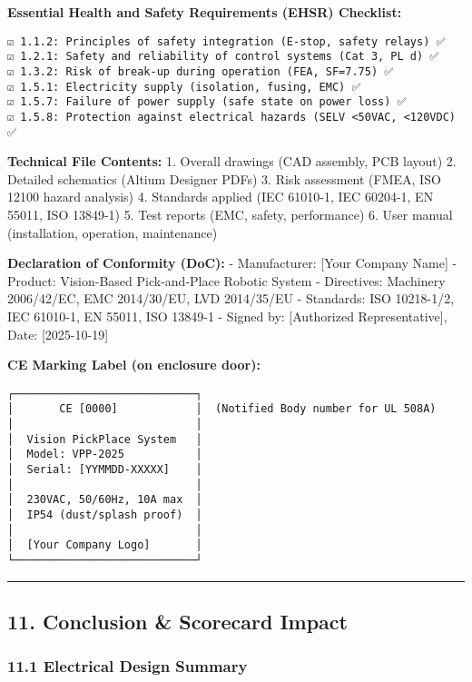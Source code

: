 \documentclass[
]{article}
\begin{document}
\textbf{Essential Health and Safety Requirements (EHSR) Checklist:}

\begin{verbatim}
☑ 1.1.2: Principles of safety integration (E-stop, safety relays) ✅
☑ 1.2.1: Safety and reliability of control systems (Cat 3, PL d) ✅
☑ 1.3.2: Risk of break-up during operation (FEA, SF=7.75) ✅
☑ 1.5.1: Electricity supply (isolation, fusing, EMC) ✅
☑ 1.5.7: Failure of power supply (safe state on power loss) ✅
☑ 1.5.8: Protection against electrical hazards (SELV <50VAC, <120VDC) ✅
\end{verbatim}

\textbf{Technical File Contents:} 1. Overall drawings (CAD assembly, PCB
layout) 2. Detailed schematics (Altium Designer PDFs) 3. Risk assessment
(FMEA, ISO 12100 hazard analysis) 4. Standards applied (IEC 61010-1, IEC
60204-1, EN 55011, ISO 13849-1) 5. Test reports (EMC, safety,
performance) 6. User manual (installation, operation, maintenance)

\textbf{Declaration of Conformity (DoC):} - Manufacturer: {[}Your
Company Name{]} - Product: Vision-Based Pick-and-Place Robotic System -
Directives: Machinery 2006/42/EC, EMC 2014/30/EU, LVD 2014/35/EU -
Standards: ISO 10218-1/2, IEC 61010-1, EN 55011, ISO 13849-1 - Signed
by: {[}Authorized Representative{]}, Date: {[}2025-10-19{]}

\textbf{CE Marking Label (on enclosure door):}

\begin{verbatim}
┌────────────────────────────┐
│       CE [0000]            │  (Notified Body number for UL 508A)
│                            │
│  Vision PickPlace System   │
│  Model: VPP-2025           │
│  Serial: [YYMMDD-XXXXX]    │
│                            │
│  230VAC, 50/60Hz, 10A max  │
│  IP54 (dust/splash proof)  │
│                            │
│  [Your Company Logo]       │
└────────────────────────────┘
\end{verbatim}

\begin{center}\rule{0.5\linewidth}{0.5pt}\end{center}

\hypertarget{conclusion-scorecard-impact}{%
\subsection{11. Conclusion \& Scorecard
Impact}\label{conclusion-scorecard-impact}}

\hypertarget{electrical-design-summary}{%
\subsubsection{11.1 Electrical Design
Summary}\label{electrical-design-summary}}
\end{document}
